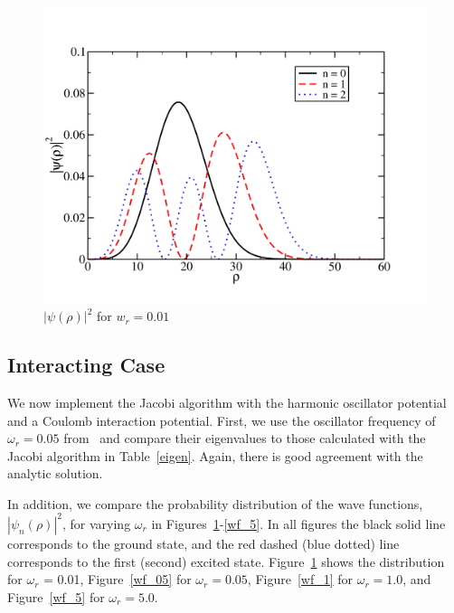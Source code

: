 \documentclass[prc,amsmath,twocolumn,superscriptaddress]{revtex4}
\begin{document}
\begin{figure}[t]
\includegraphics[scale=0.33]{wf_01.pdf}
\caption{$|\psi(\rho)|^2$ for $w_r = 0.01$}
\label{wf_01}
\end{figure}

\subsection{Interacting Case}
We now implement the Jacobi algorithm with the harmonic oscillator potential and a Coulomb interaction potential. First, we use the oscillator frequency of $\omega_r=0.05$ from~\cite{interact} and compare their eigenvalues to those calculated with the Jacobi algorithm in Table~\ref{eigen}. Again, there is good agreement with the analytic solution.

In addition, we compare the probability distribution of the wave functions, $|\psi_n(\rho)|^2$, for varying $\omega_r$ in Figures~\ref{wf_01}-\ref{wf_5}. In all figures the black solid line corresponds to the ground state, and the red dashed (blue dotted) line corresponds to the first (second) excited state. Figure~\ref{wf_01} shows the distribution for $\omega_r$ = 0.01, Figure~\ref{wf_05} for $\omega_r = 0.05$, Figure~\ref{wf_1} for $\omega_r = 1.0$, and Figure~\ref{wf_5} for $\omega_r = 5.0$.
\end{document}
